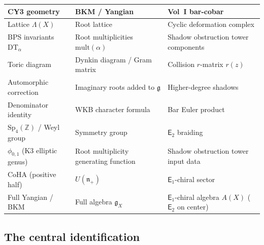 \documentclass[11pt]{article}
\newcommand{\fg}{\mathfrak{g}}
\newcommand{\fn}{\mathfrak{n}}
\newcommand{\Z}{\mathbb{Z}}
\newcommand{\Eone}{\mathsf{E}_1}
\newcommand{\Etwo}{\mathsf{E}_2}
\newcommand{\DT}{\mathrm{DT}}
\newcommand{\CoHA}{\mathrm{CoHA}}
\newcommand{\mult}{\mathrm{mult}}
\begin{document}
\begin{center}
\renewcommand{\arraystretch}{1.3}
\begin{tabular}{lll}
 \toprule
 \textbf{CY3 geometry} & \textbf{BKM / Yangian} & \textbf{Vol~I bar-cobar} \\
 \midrule
 Lattice $\Lambda(X)$ & Root lattice & Cyclic deformation complex \\
 BPS invariants $\DT_\alpha$ & Root multiplicities $\mult(\alpha)$ & Shadow obstruction tower components \\
 Toric diagram & Dynkin diagram / Gram matrix & Collision $r$-matrix $r(z)$ \\
 Automorphic correction & Imaginary roots added to $\fg$ & Higher-degree shadows \\
 Denominator identity & WKB character formula & Bar Euler product \\
 $\mathrm{Sp}_4(\Z)$ / Weyl group & Symmetry group & $\Etwo$ braiding \\
 $\phi_{0,1}$ (K3 elliptic genus) & Root multiplicity generating function & Shadow obstruction tower input data \\
 $\CoHA$ (positive half) & $U(\fn_+)$ & $\Eone$-chiral sector \\
 Full Yangian / BKM & Full algebra $\fg_X$ & $\Eone$-chiral algebra $A(X)$ ($\Etwo$ on center) \\
 \bottomrule
\end{tabular}
\end{center}

\subsection{The central identification}
\end{document}
